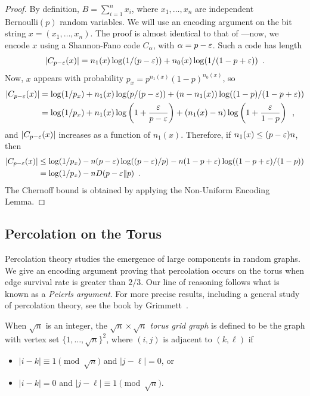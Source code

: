 \documentclass{patmorin}
\begin{document}
\begin{proof}
  By definition, $B=\sum_{i=1}^n x_i$, where $x_1,\ldots,x_n$ are
  independent $\mathrm{Bernoulli}(p)$ random variables.  We will use
  an encoding argument on the bit string $x=(x_1,\ldots,x_n)$. The
  proof is almost identical to that of ---now,
  we encode $x$ using a Shannon-Fano code $C_\alpha$, with
  $\alpha = p - \varepsilon$. Such a code has length
  \[
    |C_{p - \varepsilon}(x)| = n_1(x) \log (1/(p - \varepsilon)) + n_0(x) \log (1/(1
    - p + \varepsilon)) \enspace .
  \]
  Now, $x$ appears with probability
  $p_x = p^{n_1(x)} (1 - p)^{n_0(x)}$, so
  \begin{align*}
    |C_{p - \varepsilon}(x)| &= \log(1/p_x) + n_1(x) \log (p/(p - \varepsilon)) + (n - n_1(x)) \log ((1 - p)/(1 - p + \varepsilon)) \\
                      &= \log (1/p_x) + n_1(x) \log \left(1 + \frac{\varepsilon}{p - \varepsilon}\right) + (n_1(x) - n) \log \left(1 + \frac{\varepsilon}{1 - p}\right) \enspace ,
  \end{align*}
  and $|C_{p - \varepsilon}(x)|$ increases as a function of
  $n_1(x)$. Therefore, if $n_1(x) \le (p - \varepsilon)n$, then
  \begin{align*}
    |C_{p - \varepsilon}(x)| &\le \log (1/p_x) - n (p - \varepsilon) \log ((p - \varepsilon)/p) - n (1 - p + \varepsilon) \log ((1 - p + \varepsilon)/(1 - p)) \\
                      &= \log (1/p_x) - n D(p - \varepsilon \| p) \enspace .
  \end{align*}
  The Chernoff bound is obtained by applying the Non-Uniform Encoding
  Lemma.
\end{proof}

\subsection{Percolation on the Torus}

Percolation theory studies the emergence of large components in random
graphs. We give an encoding argument proving that percolation occurs
on the torus when edge survival rate is greater than $2/3$. Our line
of reasoning follows what is known as a \emph{Peierls argument}. For
more precise results, including a general study of percolation theory,
see the book by Grimmett~\cite{grimmett:percolation}.

When $\sqrt{n}$ is an integer, the \emph{$\sqrt{n} \times \sqrt{n}$
  torus grid graph} is defined to be the graph with vertex set
$\{1, \ldots, \sqrt{n}\}^2$, where $(i, j)$ is adjacent to $(k, \ell)$
if
\begin{itemize}[topsep=0pt]
\item $|i - k| \equiv 1 \pmod{\sqrt{n}}$ and $|j - \ell| = 0$, or
\item $|i - k| = 0$ and $|j - \ell| \equiv 1 \pmod{\sqrt{n}}$.
\end{itemize}
\end{document}
